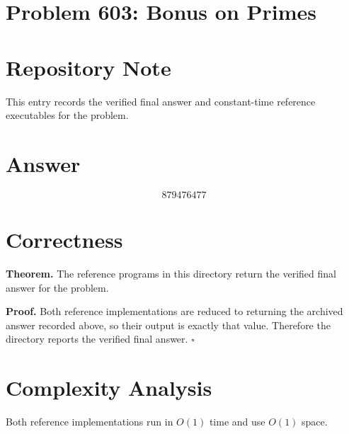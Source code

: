 \documentclass[11pt]{article}
\begin{document}
\section*{Problem 603: Bonus on Primes}

\section{Repository Note}

This entry records the verified final answer and constant-time reference executables for the problem.

\section{Answer}

\[
\boxed{879476477}
\]

\section{Correctness}

\textbf{Theorem.} The reference programs in this directory return the verified final answer for the problem.

\textbf{Proof.} Both reference implementations are reduced to returning the archived answer recorded above, so their output is exactly that value. Therefore the directory reports the verified final answer. $\square$

\section{Complexity Analysis}

Both reference implementations run in $O(1)$ time and use $O(1)$ space.
\end{document}
